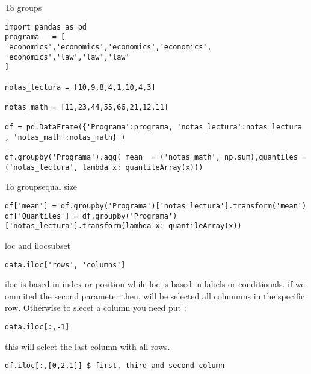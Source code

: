 \documentclass{beamer}
\begin{document}
\begin{frame}[fragile]{To groups}
\begin{lstlisting}
import pandas as pd
programa   = [
'economics','economics','economics','economics',
'economics','law','law','law'
]

notas_lectura = [10,9,8,4,1,10,4,3]

notas_math = [11,23,44,55,66,21,12,11]

df = pd.DataFrame({'Programa':programa, 'notas_lectura':notas_lectura , 'notas_math':notas_math} )

df.groupby('Programa').agg( mean  = ('notas_math', np.sum),quantiles = ('notas_lectura', lambda x: quantileArray(x)))
\end{lstlisting}
\end{frame}



\begin{frame}[fragile]{To groups}{equal size}
\begin{lstlisting}
df['mean'] = df.groupby('Programa')['notas_lectura'].transform('mean')
df['Quantiles'] = df.groupby('Programa')['notas_lectura'].transform(lambda x: quantileArray(x))
\end{lstlisting}
\end{frame}

\begin{comment}
to read 
https://pandas.pydata.org/docs/user_guide/groupby.html

https://www.analyticsvidhya.com/blog/2020/03/understanding-transform-function-python/
\end{comment}


\begin{frame}[fragile]{loc and iloc}{subset}
\begin{lstlisting}
data.iloc['rows', 'columns']
\end{lstlisting}
iloc is based in index or position while 
loc is based in labels or conditionals.
if we ommited the second parameter then, will be selected all colummns in the specific row. Otherwise to slecet a column you need put :
\begin{lstlisting}
data.iloc[:,-1]
\end{lstlisting}
this will select the last column with all rows.
\end{frame}

\begin{frame}[fragile]
\begin{lstlisting}
df.iloc[:,[0,2,1]] $ first, third and second column
\end{lstlisting}
\end{frame}
\end{document}

